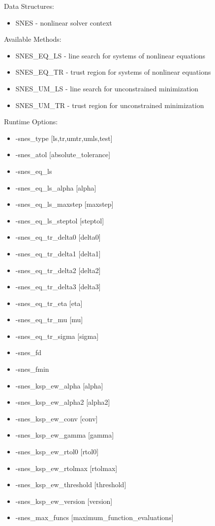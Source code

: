 \noindent
Data Structures:
\begin{itemize}
\item SNES - nonlinear solver context
\end{itemize}
Available Methods: 
\begin{itemize}
\item SNES\_EQ\_LS - line search for systems of nonlinear equations
\item SNES\_EQ\_TR - trust region for systems of nonlinear equations
\item SNES\_UM\_LS - line search for unconstrained minimization
\item SNES\_UM\_TR - trust region for unconstrained minimization
\end{itemize}
Runtime Options:
\begin{itemize}
\item -snes\_type [ls,tr,umtr,umls,test]
\item -snes\_atol [absolute\_tolerance]
\item -snes\_eq\_ls
\item -snes\_eq\_ls\_alpha [alpha]
\item -snes\_eq\_ls\_maxstep [maxstep]
\item -snes\_eq\_ls\_steptol [steptol]
\item -snes\_eq\_tr\_delta0 [delta0]
\item -snes\_eq\_tr\_delta1 [delta1]
\item -snes\_eq\_tr\_delta2 [delta2]
\item -snes\_eq\_tr\_delta3 [delta3]
\item -snes\_eq\_tr\_eta [eta]
\item -snes\_eq\_tr\_mu [mu]
\item -snes\_eq\_tr\_sigma [sigma]
\item -snes\_fd
\item -snes\_fmin
\item -snes\_ksp\_ew\_alpha [alpha]
\item -snes\_ksp\_ew\_alpha2 [alpha2]
\item -snes\_ksp\_ew\_conv [conv]
\item -snes\_ksp\_ew\_gamma [gamma]
\item -snes\_ksp\_ew\_rtol0 [rtol0]
\item -snes\_ksp\_ew\_rtolmax [rtolmax]
\item -snes\_ksp\_ew\_threshold [threshold]
\item -snes\_ksp\_ew\_version [version]
\item -snes\_max\_funcs [maximum\_function\_evaluations]

\end{itemize}
